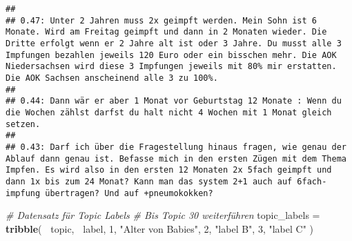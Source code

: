 \documentclass[
]{book}
\newenvironment{Shaded}{\begin{snugshade}}{\end{snugshade}}
\newcommand{\CommentTok}[1]{\textcolor[rgb]{0.56,0.35,0.01}{\textit{#1}}}
\newcommand{\DecValTok}[1]{\textcolor[rgb]{0.00,0.00,0.81}{#1}}
\newcommand{\KeywordTok}[1]{\textcolor[rgb]{0.13,0.29,0.53}{\textbf{#1}}}
\newcommand{\NormalTok}[1]{#1}
\newcommand{\OperatorTok}[1]{\textcolor[rgb]{0.81,0.36,0.00}{\textbf{#1}}}
\newcommand{\StringTok}[1]{\textcolor[rgb]{0.31,0.60,0.02}{#1}}
\begin{document}
\begin{verbatim}
## 
## 0.47: Unter 2 Jahren muss 2x geimpft werden. Mein Sohn ist 6 Monate. Wird am Freitag geimpft und dann in 2 Monaten wieder. Die Dritte erfolgt wenn er 2 Jahre alt ist oder 3 Jahre. Du musst alle 3 Impfungen bezahlen jeweils 120 Euro oder ein bisschen mehr. Die AOK Niedersachsen wird diese 3 Impfungen jeweils mit 80% mir erstatten. Die AOK Sachsen anscheinend alle 3 zu 100%.
## 
## 0.44: Dann wär er aber 1 Monat vor Geburtstag 12 Monate : Wenn du die Wochen zählst darfst du halt nicht 4 Wochen mit 1 Monat gleich setzen.
## 
## 0.43: Darf ich über die Fragestellung hinaus fragen, wie genau der Ablauf dann genau ist. Befasse mich in den ersten Zügen mit dem Thema Impfen. Es wird also in den ersten 12 Monaten 2x 5fach geimpft und dann 1x bis zum 24 Monat? Kann man das system 2+1 auch auf 6fach-impfung übertragen? Und auf +pneumokokken?
\end{verbatim}

\begin{Shaded}
\begin{Highlighting}[]
\CommentTok{# Datensatz für Topic Labels}
\CommentTok{# Bis Topic 30 weiterführen}
\NormalTok{topic_labels =}\StringTok{ }\KeywordTok{tribble}\NormalTok{(}
  \OperatorTok{~}\NormalTok{topic, }\OperatorTok{~}\NormalTok{label,}
  \DecValTok{1}\NormalTok{,      }\StringTok{"Alter von Babies"}\NormalTok{,}
  \DecValTok{2}\NormalTok{,      }\StringTok{"label B"}\NormalTok{,}
  \DecValTok{3}\NormalTok{,      }\StringTok{"label C"}
\NormalTok{)}
\end{Highlighting}
\end{Shaded}

  
\end{document}
